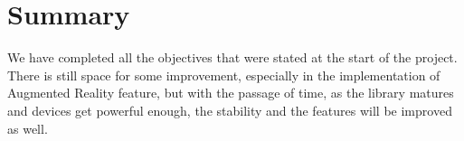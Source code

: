 \section{Summary}
We have completed all the objectives that were stated at the start of the project. There is still space for some improvement, especially in the implementation of Augmented Reality feature, but with the passage of time, as the library matures and devices get powerful enough, the stability and the features will be improved as well.


